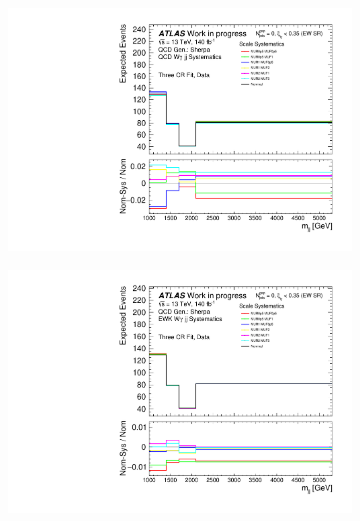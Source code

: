 \begin{figure}[t]
  \begin{subfigure}[b]{0.49\textwidth}
    \centering
    \includegraphics[width=\textwidth]{plots/diffx/scalesysts/data/mjj_QCD_Sh2211_BSSTRONGTHEORYSYSTS_3cr_Scale_0p01sigma_allvariations.pdf}
    \caption{}
  \end{subfigure}
  \hfill
  \begin{subfigure}[b]{0.49\textwidth}
    \centering
    \includegraphics[width=\textwidth]{plots/diffx/scalesysts/data/mjj_QCD_Sh2211_BSEWTHEORYSYSTS_3cr_Scale_0p01sigma_allvariations.pdf}
    \caption{}
  \end{subfigure}
  \hfill
  \begin{subfigure}[b]{0.49\textwidth}
    \centering

\end{subfigure}
\end{figure}
